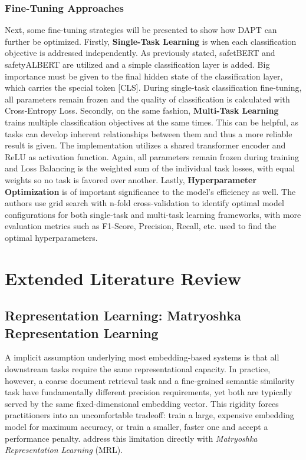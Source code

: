 \documentclass[a4paper,12pt]{article}
\begin{document}
\subsubsection{Fine-Tuning Approaches}
Next, some fine-tuning strategies will be presented to show how DAPT can further be optimized. Firstly, \textbf{Single-Task Learning} is when each classification objective is addressed independently. As previously stated, safetBERT and safetyALBERT are utilized and a simple classification layer is added. Big importance must be given to the final hidden state of the classification layer, which carries the special token [CLS]. During single-task classification fine-tuning, all parameters remain frozen and the quality of classification is calculated with Cross-Entropy Loss. Secondly, on the same fashion, \textbf{Multi-Task Learning}
trains multiple classification objectives at the same times. This can be helpful, as tasks can develop inherent relationships between them and thus a more reliable result is given. The implementation utilizes a shared transformer encoder and ReLU as activation function. Again, all parameters remain frozen during training and Loss Balancing is the weighted sum of the individual task losses, with equal weights so no task is favored over another. Lastly, \textbf{Hyperparameter Optimization} is of important significance to the model's efficiency as well. The authors use grid search with n-fold cross-validation to identify optimal model 
configurations for both single-task and multi-task learning frameworks, with more evaluation metrics such as F1-Score, Precision, Recall, etc. used to find the optimal hyperparameters.

\clearpage
\section{Extended Literature Review}

\subsection{Representation Learning: Matryoshka Representation Learning}

A implicit assumption underlying most embedding-based systems is that all downstream 
tasks require the same representational capacity. In practice, however, a coarse 
document retrieval task and a fine-grained semantic similarity task have fundamentally 
different precision requirements, yet both are typically served by the same 
fixed-dimensional embedding vector. This rigidity forces practitioners into an 
uncomfortable tradeoff: train a large, expensive embedding model for maximum accuracy, 
or train a smaller, faster one and accept a performance penalty. \citet{kusupati2022matryoshka} 
address this limitation directly with \textit{Matryoshka Representation Learning} (MRL).
\end{document}
